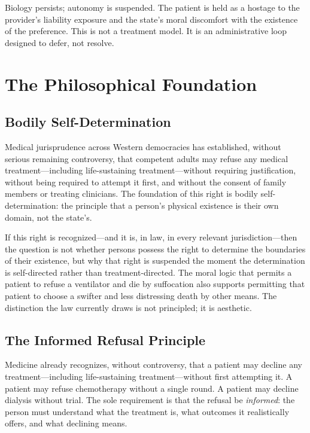 \documentclass[11pt, letterpaper]{article}
\begin{document}
Biology persists; autonomy is suspended. The patient is held as a hostage to the provider's
liability exposure and the state's moral discomfort with the existence of the preference.
This is not a treatment model. It is an administrative loop designed to defer, not resolve.

\newpage

\section{The Philosophical Foundation}

\subsection{Bodily Self-Determination}

Medical jurisprudence across Western democracies has established, without serious remaining
controversy, that competent adults may refuse any medical treatment---including life-sustaining
treatment---without requiring justification, without being required to attempt it first, and
without the consent of family members or treating clinicians. The foundation of this right
is bodily self-determination: the principle that a person's physical existence is their own
domain, not the state's.

If this right is recognized---and it is, in law, in every relevant jurisdiction---then the
question is not whether persons possess the right to determine the boundaries of their
existence, but why that right is suspended the moment the determination is self-directed
rather than treatment-directed. The moral logic that permits a patient to refuse a ventilator
and die by suffocation also supports permitting that patient to choose a swifter and less
distressing death by other means. The distinction the law currently draws is not principled;
it is aesthetic.

\subsection{The Informed Refusal Principle}

Medicine already recognizes, without controversy, that a patient may decline any
treatment---including life-sustaining treatment---without first attempting it. A patient may
refuse chemotherapy without a single round. A patient may decline dialysis without trial.
The sole requirement is that the refusal be \textit{informed}: the person must understand
what the treatment is, what outcomes it realistically offers, and what declining means.
\end{document}

